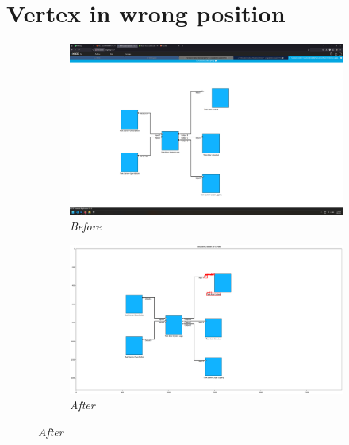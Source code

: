 \documentclass{article}
\begin{document}
\section{Vertex in wrong position}
\begin{figure}[H]
    \centering
    \begin{subfigure}[t]{0.9\textwidth}
        \centering
        \includegraphics[width=\textwidth]{testcases/vertex_task_wrong_position/134530-573593_input_image.png}
        \caption*{\textit{Before}}
    \end{subfigure}
    \newline
    \begin{subfigure}[t]{0.9\textwidth}
        \centering
        \includegraphics[width=\textwidth]{testcases/vertex_task_wrong_position/134550-162424_element_bbox_errors_labeled_colored.png}
        \caption*{\textit{After}}
    \end{subfigure}
    \label{fig:vertex_wrong_position}
\end{figure}
\newpage
\end{document}
